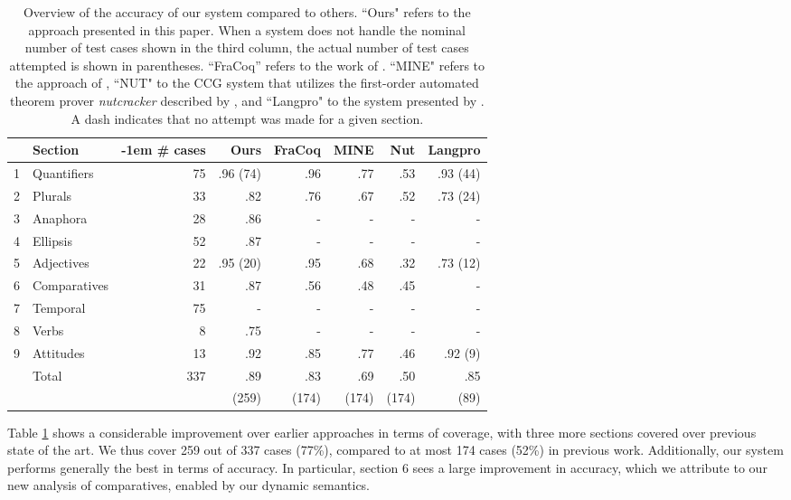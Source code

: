 \documentclass{article}
\begin{document}
\providecommand\forcecenter{\multicolumn{1}{c}}
\begin{table}
  \centering
\begin{tabular}{rlrrrrrr}
  & Section      & {\kern -1em} \# cases & Ours     & FraCoq & MINE & Nut  & Langpro  \\ \hline
1 & Quantifiers  & 75          & .96 (74) & .96    & .77  & .53  & .93 (44) \\
2 & Plurals      & 33          & .82      & .76    & .67  & .52  & .73 (24) \\
3 & Anaphora     & 28          & .86      &   -    & -    & -    &  -       \\
4 & Ellipsis     & 52          & .87      &   -    & -    & -    &  -       \\
5 & Adjectives   & 22          & .95 (20) & .95    & .68  & .32  & .73 (12) \\
6 & Comparatives & 31          & .87      & .56    & .48  & .45  &  -       \\
7 & Temporal     & 75          &  -       &   -    &   -  &  -   &  -       \\
8 & Verbs        & 8           & .75      &   -    & -    & -    &  -       \\
9 & Attitudes    & 13          & .92      & .85    & .77  & .46  & .92 (9)  \\ \hline
  & Total        & 337         & .89      & .83    & .69  & .50  & .85  \\
  &              &             & (259)    & (174)  & (174)& (174)& (89)
  \end{tabular}
  \caption{Overview of the accuracy of our system compared to others.
    ``Ours" refers to the approach presented in this paper. When a
    system does not handle the nominal number of test cases shown in the
    third column, the actual number of test cases attempted is shown in
    parentheses.  ``FraCoq'' refers to the work of
    \citet{bernardy_type_2017}. ``MINE" refers to the approach of
    \citet{Mineshima:2015}, ``NUT" to the CCG system that utilizes the
    first-order automated theorem prover \textit{nutcracker} described
    by \citet{bos:2008}, and ``Langpro" to the system presented by
    \citet{Abzianidze:2015}. A dash indicates that no attempt was made
    for a given section. }
  \label{tbl:results}
\end{table}

Table \ref{tbl:results} shows a considerable improvement over earlier
approaches in terms of coverage, with three more sections covered over
previous state of the art. We thus cover 259 out of 337 cases (77\%),
compared to at most 174 cases (52\%) in previous work. Additionally,
our system performs generally the best in terms of accuracy. In
particular, section 6 sees a large improvement in accuracy, which we
attribute to our new analysis of comparatives, enabled by our dynamic
semantics.
\end{document}
